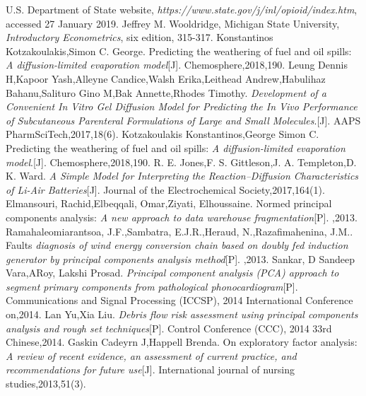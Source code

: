 \documentclass{mcmthesis}
\numberwithin{equation}{section}
\numberwithin{figure}{section}
\numberwithin{table}{section}
\theoremstyle{mydef}
\begin{document}
\newpage

%
%
\begin{thebibliography}{9}%
  U.S. Department of State website, \emph{https://www.state.gov/j/inl/opioid/index.htm}, accessed 27 January 2019.
  Jeffrey M. Wooldridge, Michigan State University, \emph{Introductory Econometrics}, six edition, 315-317.
 Konstantinos Kotzakoulakis,Simon C. George. Predicting the weathering of fuel and oil spills: \emph{A diffusion-limited evaporation model}[J]. Chemosphere,2018,190.
 Leung Dennis H,Kapoor Yash,Alleyne Candice,Walsh Erika,Leithead Andrew,Habulihaz Bahanu,Salituro Gino M,Bak Annette,Rhodes Timothy. \emph{Development of a Convenient In Vitro Gel Diffusion Model for Predicting the In Vivo Performance of Subcutaneous Parenteral Formulations of Large and Small Molecules}.[J]. AAPS PharmSciTech,2017,18(6).
 Kotzakoulakis Konstantinos,George Simon C. Predicting the weathering of fuel and oil spills: \emph{A diffusion-limited evaporation model}.[J]. Chemosphere,2018,190.
 R. E. Jones,F. S. Gittleson,J. A. Templeton,D. K. Ward. \emph{A Simple Model for Interpreting the Reaction–Diffusion Characteristics of Li-Air Batteries}[J]. Journal of the Electrochemical Society,2017,164(1).
Elmansouri, Rachid,Elbeqqali, Omar,Ziyati, Elhoussaine. Normed principal components analysis: \emph{A new approach to data warehouse fragmentation}[P]. ,2013.
Ramahaleomiarantsoa, J.F.,Sambatra, E.J.R.,Heraud, N.,Razafimahenina, J.M.. Faults \emph{diagnosis of wind energy conversion chain based on doubly fed induction generator by principal components analysis method}[P]. ,2013.
Sankar, D Sandeep Vara,ARoy, Lakshi Prosad. \emph{Principal component analysis (PCA) approach to segment primary components from pathological phonocardiogram}[P]. Communications and Signal Processing (ICCSP), 2014 International Conference on,2014.
Lan Yu,Xia Liu. \emph{Debris flow risk assessment using principal components analysis and rough set techniques}[P]. Control Conference (CCC), 2014 33rd Chinese,2014.
Gaskin Cadeyrn J,Happell Brenda. On exploratory factor analysis: \emph{A review of recent evidence, an assessment of current practice, and recommendations for future use}[J]. International journal of nursing studies,2013,51(3).
\end{thebibliography}
\end{document}
